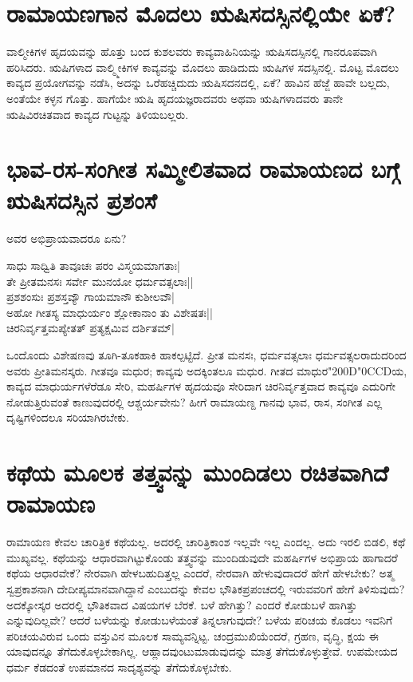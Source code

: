 \section*{ರಾಮಾಯಣಗಾನ ಮೊದಲು ಋಷಿಸದಸ್ಸಿನಲ್ಲಿಯೇ ಏಕೆ?}

ವಾಲ್ಮೀಕಿಗಳ ಹೃದಯವನ್ನು ಹೊತ್ತು ಬಂದ ಕುಶಲವರು ಕಾವ್ಯವಾಹಿನಿಯನ್ನು ಋಷಿಸದಸ್ಸಿನಲ್ಲಿ ಗಾನರೂಪವಾಗಿ ಹರಿಸಿದರು. ಋಷಿಗಳಾದ ವಾಲ್ಮ್ಮೀಕಿಗಳ ಕಾವ್ಯವನ್ನು ಮೊದಲು ಹಾಡಿದುದು ಋಷಿಗಳ ಸದಸ್ಸಿನಲ್ಲಿ. ಮೊಟ್ಟ ಮೊದಲು ಕಾವ್ಯದ ಪ್ರಯೋಗವನ್ನು ನಡೆಸಿ, ಅದನ್ನು ಒರೆಹಚ್ಚಿದುದು ಋಷಿಸದನದಲ್ಲಿ, ಏಕೆ? ಹಾವಿನ ಹೆಜ್ಜೆ ಹಾವೇ ಬಲ್ಲದು, ಅಂತೆಯೇ ಕಳ್ಳನ ಗೊತ್ತು. ಹಾಗೆಯೇ  ಋಷಿ ಹೃದಯಜ್ಞರಾದವರು ಅಥವಾ ಋಷಿಗಳಾದವರು ತಾನೇ ಋಷಿವಿರಚಿತವಾದ ಕಾವ್ಯದ ಗುಟ್ಟನ್ನು ತಿಳಿಯಬಲ್ಲರು. 

\section*{ಭಾವ-ರಸ-ಸಂಗೀತ ಸಮ್ಮೀಲಿತವಾದ ರಾಮಾಯಣದ ಬಗ್ಗೆ ಋಷಿಸದಸ್ಸಿನ ಪ್ರಶಂಸೆ}

ಅವರ ಅಭಿಪ್ರಾಯವಾದರೂ ಏನು?

\begin{shloka}
ಸಾಧು ಸಾಧ್ವಿತಿ ತಾವೂಚಃ ಪರಂ ವಿಸ್ಮಯಮಾಗತಾಃ|\\
ತೇ ಪ್ರೀತಮನಸಃ ಸರ್ವೇ ಮುನಯೋ ಧರ್ಮವತ್ಸಲಾಃ||\\
ಪ್ರಶಶಂಸುಃ ಪ್ರಶಸ್ತವ್ಯೌ ಗಾಯಮಾನೌ ಕುಶೀಲವೌ|\\
ಅಹೋ ಗೀತಸ್ಯ ಮಾಧುರ್ಯಂ ಶ್ಲೋಕಾನಾಂ ತು ವಿಶೇಷತಃ||\\
ಚಿರನಿರ್ವೃತ್ತಮಪ್ಯೇತತ್ ಪ್ರತ್ಯಕ್ಷಮಿವ ದರ್ಶಿತಮ್|\\
\end{shloka}

ಒಂದೊಂದು ವಿಶೇಷಣವು ತೂಗಿ-ತೂಕಹಾಕಿ ಹಾಕಲ್ಪಟ್ಟಿದೆ. ಪ್ರೀತ ಮನಸಃ, ಧರ್ಮವತ್ಸಲಾಃ ಧರ್ಮವತ್ಸಲರಾದುದರಿಂದ ಅವರು ಪ್ರೀತಿಮನಸ್ಕರು. ಗೀತವೂ ಮಧುರ; ಕಾವ್ಯವು ಅದಕ್ಕಿಂತಲೂ ಮಧುರ. ಗೀತದ ಮಾಧುರ\char"200D\char"0CCDಯ,  ಕಾವ್ಯದ ಮಾಧುರ್ಯಗಳೆರೆಡೂ ಸೇರಿ, ಮಹರ್ಷಿಗಳ ಹೃದಯವೂ ಸೇರಿದಾಗ ಚಿರನಿರ್ವೃತ್ತವಾದ ಕಾವ್ಯವೂ ಎದುರಿಗೇ ನೋಡುತ್ತಿರುವಂತೆ ಕಾಣುವುದರಲ್ಲಿ ಆಶ್ಚರ್ಯವೇನು? ಹೀಗೆ ರಾಮಾಯಣ್ದ ಗಾನವು ಭಾವ, ರಾಸ, ಸಂಗೀತ ಎಲ್ಲ ದೃಷ್ಟಿಗಳಿಂದಲೂ ಸರಿಯಾಗಿರಬೇಕು. 

\section*{ಕಥೆಯ ಮೂಲಕ ತತ್ತ್ವವನ್ನು ಮುಂದಿಡಲು ರಚಿತವಾಗಿದೆ ರಾಮಾಯಣ}

ರಾಮಾಯಣ ಕೇವಲ ಚಾರಿತ್ರಿಕ ಕಥೆಯಲ್ಲ. ಅದರಲ್ಲಿ ಚಾರಿತ್ರಿಕಾಂಶ ಇಲ್ಲವೇ ಇಲ್ಲ ಎಂದಲ್ಲ. ಅದು ಇರಲಿ ಬಿಡಲಿ, ಕಥೆ ಮುಖ್ಯವಲ್ಲ. ಕಥೆಯನ್ನು ಆಧಾರವಾಗಿಟ್ಟುಕೊಂಡು ತತ್ತ್ವವನ್ನು ಮುಂದಿಡುವುದೇ ಮಹರ್ಷಿಗಳ ಅಭಿಪ್ರಾಯ ಹಾಗಾದರೆ ಕಥೆಯ ಆಧಾರವೇಕೆ? ನೇರವಾಗಿ ಹೇಳಬಹುದಿತ್ತಲ್ಲ ಎಂದರೆ, ನೇರವಾಗಿ ಹೇಳುವುದಾದರೆ ಹೇಗೆ ಹೇಳಬೇಕು? ಅತ್ಮ ಸ್ವಪ್ರಕಾಶನಾಗಿ ದೇದೀಪ್ಯಮಾನವಾಗಿದ್ದಾನೆ ಎಂಬುದನ್ನು ಕೇವಲ ಭೌತಿಕಪ್ರಪಂಚದಲ್ಲಿ ಇರುವವರಿಗೆ ಹೇಗೆ ತಿಳಿಸುವುದು? ಅದಕ್ಕೋಸ್ಕರ ಅದರಲ್ಲಿ ಭೌತಿಕವಾದ ವಿಷಯಗಳ ಬೆರಕೆ. ಬಳೆ ಹೇಗಿತ್ತು? ಎಂದರೆ ಕೋಡುಬಳೆ ಹಾಗಿತ್ತು ಎನ್ನುವುದಿಲ್ಲವೇ? ಆದರೆ ಬಳೆಯನ್ನು ಕೋಡುಬಳೆಯಂತೆ ತಿನ್ನಲಾಗುವುದೇ? ಬಳೆಯ ಪರಿಚಯ ಕೊಡಲು ಇವನಿಗೆ ಪರಿಚಯವಿರುವ ಒಂದು ವಸ್ತುವಿನ ಮೂಲಕ ಸಾಮ್ಯವನ್ನಿಟ್ಟ. ಚಂದ್ರಮುಖಿಯೆಂದರೆ, ಗ್ರಹಣ, ವೃದ್ಧಿ, ಕ್ಷಯ ಈ ಯಾವುದನ್ನೂ ತೆಗೆದುಕೊಳ್ಳಬೇಕಾಗಿಲ್ಲ. ಆಹ್ಲಾದವುಂಟುಮಾಡುವುದನ್ನು ಮಾತ್ರ ತೆಗೆದುಕೊಳ್ಳುತ್ತೇವೆ. ಉಪಮೇಯದ ಧರ್ಮ ಕೆಡದಂತೆ ಉಪಮಾನದ ಸಾದೃಶ್ಯವನ್ನು ತೆಗೆದುಕೊಳ್ಳಬೇಕು. 

